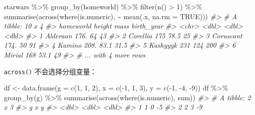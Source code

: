\documentclass[
]{book}
\newenvironment{Shaded}{\begin{snugshade}}{\end{snugshade}}
\newcommand{\AttributeTok}[1]{\textcolor[rgb]{0.77,0.63,0.00}{#1}}
\newcommand{\CommentTok}[1]{\textcolor[rgb]{0.56,0.35,0.01}{\textit{#1}}}
\newcommand{\ConstantTok}[1]{\textcolor[rgb]{0.00,0.00,0.00}{#1}}
\newcommand{\DecValTok}[1]{\textcolor[rgb]{0.00,0.00,0.81}{#1}}
\newcommand{\FunctionTok}[1]{\textcolor[rgb]{0.00,0.00,0.00}{#1}}
\newcommand{\NormalTok}[1]{#1}
\newcommand{\OtherTok}[1]{\textcolor[rgb]{0.56,0.35,0.01}{#1}}
\newcommand{\SpecialCharTok}[1]{\textcolor[rgb]{0.00,0.00,0.00}{#1}}
\begin{document}
\begin{Shaded}
\begin{Highlighting}[]
\NormalTok{starwars }\SpecialCharTok{\%\textgreater{}\%} 
  \FunctionTok{group\_by}\NormalTok{(homeworld) }\SpecialCharTok{\%\textgreater{}\%} 
  \FunctionTok{filter}\NormalTok{(}\FunctionTok{n}\NormalTok{() }\SpecialCharTok{\textgreater{}} \DecValTok{1}\NormalTok{) }\SpecialCharTok{\%\textgreater{}\%} 
  \FunctionTok{summarise}\NormalTok{(}\FunctionTok{across}\NormalTok{(}\FunctionTok{where}\NormalTok{(is.numeric), }\SpecialCharTok{\textasciitilde{}} \FunctionTok{mean}\NormalTok{(.x, }\AttributeTok{na.rm =} \ConstantTok{TRUE}\NormalTok{)))}
\CommentTok{\#\textgreater{} \# A tibble: 10 x 4}
\CommentTok{\#\textgreater{}   homeworld height  mass birth\_year}
\CommentTok{\#\textgreater{}   \textless{}chr\textgreater{}      \textless{}dbl\textgreater{} \textless{}dbl\textgreater{}      \textless{}dbl\textgreater{}}
\CommentTok{\#\textgreater{} 1 Alderaan    176.  64         43  }
\CommentTok{\#\textgreater{} 2 Corellia    175   78.5       25  }
\CommentTok{\#\textgreater{} 3 Coruscant   174.  50         91  }
\CommentTok{\#\textgreater{} 4 Kamino      208.  83.1       31.5}
\CommentTok{\#\textgreater{} 5 Kashyyyk    231  124        200  }
\CommentTok{\#\textgreater{} 6 Mirial      168   53.1       49  }
\CommentTok{\#\textgreater{} \# ... with 4 more rows}
\end{Highlighting}
\end{Shaded}

\texttt{across()} 不会选择分组变量：

\begin{Shaded}
\begin{Highlighting}[]
\NormalTok{df }\OtherTok{\textless{}{-}} \FunctionTok{data.frame}\NormalTok{(}\AttributeTok{g =} \FunctionTok{c}\NormalTok{(}\DecValTok{1}\NormalTok{, }\DecValTok{1}\NormalTok{, }\DecValTok{2}\NormalTok{), }\AttributeTok{x =} \FunctionTok{c}\NormalTok{(}\SpecialCharTok{{-}}\DecValTok{1}\NormalTok{, }\DecValTok{1}\NormalTok{, }\DecValTok{3}\NormalTok{), }\AttributeTok{y =} \FunctionTok{c}\NormalTok{(}\SpecialCharTok{{-}}\DecValTok{1}\NormalTok{, }\SpecialCharTok{{-}}\DecValTok{4}\NormalTok{, }\SpecialCharTok{{-}}\DecValTok{9}\NormalTok{))}
\NormalTok{df }\SpecialCharTok{\%\textgreater{}\%} 
  \FunctionTok{group\_by}\NormalTok{(g) }\SpecialCharTok{\%\textgreater{}\%} 
  \FunctionTok{summarise}\NormalTok{(}\FunctionTok{across}\NormalTok{(}\FunctionTok{where}\NormalTok{(is.numeric), sum))}
\CommentTok{\#\textgreater{} \# A tibble: 2 x 3}
\CommentTok{\#\textgreater{}       g     x     y}
\CommentTok{\#\textgreater{}   \textless{}dbl\textgreater{} \textless{}dbl\textgreater{} \textless{}dbl\textgreater{}}
\CommentTok{\#\textgreater{} 1     1     0    {-}5}
\CommentTok{\#\textgreater{} 2     2     3    {-}9}
\end{Highlighting}
\end{Shaded}
\end{document}

